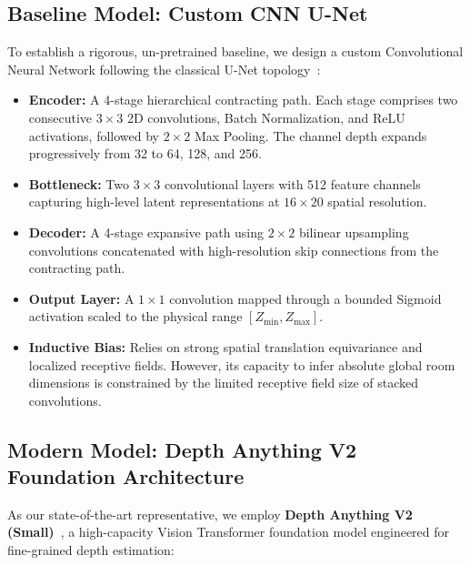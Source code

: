 \documentclass[twoside,final]{hcmut-report}
\begin{document}
\label{sec:methodology}

\subsection{Baseline Model: Custom CNN U-Net}

To establish a rigorous, un-pretrained baseline, we design a custom Convolutional Neural Network following the classical U-Net topology~\cite{ronneberger2015u}:

\begin{itemize}

  \item \textbf{Encoder:} A 4-stage hierarchical contracting path. Each stage comprises two consecutive $3 \times 3$ 2D convolutions, Batch Normalization, and ReLU activations, followed by $2 \times 2$ Max Pooling. The channel depth expands progressively from 32 to 64, 128, and 256.

  \item \textbf{Bottleneck:} Two $3 \times 3$ convolutional layers with 512 feature channels capturing high-level latent representations at $16 \times 20$ spatial resolution.

  \item \textbf{Decoder:} A 4-stage expansive path using $2 \times 2$ bilinear upsampling convolutions concatenated with high-resolution skip connections from the contracting path.

  \item \textbf{Output Layer:} A $1 \times 1$ convolution mapped through a bounded Sigmoid activation scaled to the physical range $[Z_{\min}, Z_{\max}]$.

  \item \textbf{Inductive Bias:} Relies on strong spatial translation equivariance and localized receptive fields. However, its capacity to infer absolute global room dimensions is constrained by the limited receptive field size of stacked convolutions.

\end{itemize}

\subsection{Modern Model: Depth Anything V2 Foundation Architecture}

As our state-of-the-art representative, we employ \textbf{Depth Anything V2 (Small)}~\cite{yang2024depth}, a high-capacity Vision Transformer foundation model engineered for fine-grained depth estimation:
\end{document}

